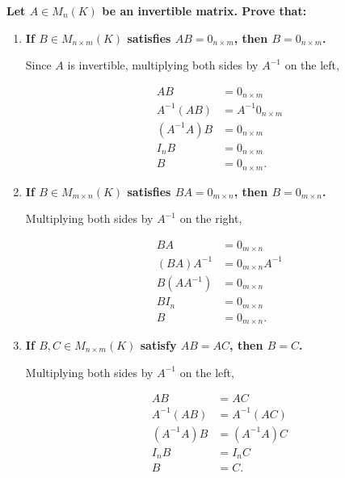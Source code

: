 \item \textbf{Let $A\in M_n(K)$ be an invertible matrix. Prove that:}

\begin{enumerate}[label=\alph*)]

\item \textbf{If $B\in M_{n\times m}(K)$
satisfies $AB=0_{n\times m}$, then
$B=0_{n\times m}$.}

\begin{answer}
    Since $A$ is invertible, multiplying
    both sides by $A^{-1}$ on the left,

    $$
    \begin{aligned}
    AB &= 0_{n\times m}\\
    A^{-1}(AB) &= A^{-1}0_{n\times m}\\
    (A^{-1}A)B &= 0_{n\times m}\\
    I_nB &= 0_{n\times m}\\
    B &= 0_{n\times m}.
    \end{aligned}
    $$
\end{answer}

\item \textbf{If $B\in M_{m\times n}(K)$
satisfies $BA=0_{m\times n}$, then
$B=0_{m\times n}$.}

\begin{answer}
    Multiplying both sides by $A^{-1}$
    on the right,

    $$
    \begin{aligned}
    BA &= 0_{m\times n}\\
    (BA)A^{-1} &= 0_{m\times n}A^{-1}\\
    B(AA^{-1}) &= 0_{m\times n}\\
    BI_n &= 0_{m\times n}\\
    B &= 0_{m\times n}.
    \end{aligned}
    $$
\end{answer}

\item \textbf{If $B,C\in M_{n\times m}(K)$
satisfy $AB=AC$, then $B=C$.}

\begin{answer}
    Multiplying both sides by $A^{-1}$
    on the left,

    $$
    \begin{aligned}
    AB &= AC\\
    A^{-1}(AB) &= A^{-1}(AC)\\
    (A^{-1}A)B &= (A^{-1}A)C\\
    I_nB &= I_nC\\
    B &= C.
    \end{aligned}
    $$
\end{answer}


\end{enumerate}
